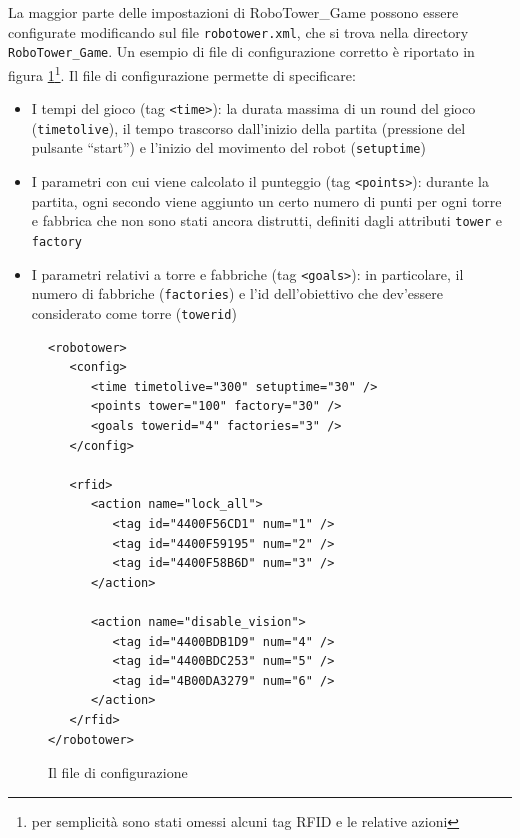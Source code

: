La maggior parte delle impostazioni di RoboTower\_Game possono essere configurate modificando sul file \verb|robotower.xml|, che si trova nella directory \verb|RoboTower_Game|. Un esempio di file di configurazione corretto è riportato in figura \ref{fig:configfile}\footnote{per semplicità sono stati omessi alcuni tag RFID e le relative azioni}. Il file di configurazione permette di specificare:
\begin{itemize}
\item I tempi del gioco (tag \lstinline|<time>|): la durata massima di un round del gioco (\lstinline|timetolive|), il tempo trascorso dall'inizio della partita (pressione del pulsante ``start'') e l'inizio del movimento del robot (\lstinline|setuptime|)
\item I parametri con cui viene calcolato il punteggio (tag \lstinline|<points>|): durante la partita, ogni secondo viene aggiunto un certo numero di punti per ogni torre e fabbrica che non sono stati ancora distrutti, definiti dagli attributi \lstinline|tower| e \lstinline|factory|
\item I parametri relativi a torre e fabbriche (tag \lstinline|<goals>|): in particolare, il numero di fabbriche (\lstinline|factories|) e l'id dell'obiettivo che dev'essere considerato come torre (\lstinline|towerid|)
\end{itemize}

\begin{figure}
{
\begin{lstlisting}
<robotower>
   <config>
      <time timetolive="300" setuptime="30" />
      <points tower="100" factory="30" />
      <goals towerid="4" factories="3" />
   </config>

   <rfid>
      <action name="lock_all">
         <tag id="4400F56CD1" num="1" />
         <tag id="4400F59195" num="2" />
         <tag id="4400F58B6D" num="3" />
      </action>
      
      <action name="disable_vision">
         <tag id="4400BDB1D9" num="4" />
         <tag id="4400BDC253" num="5" />
         <tag id="4B00DA3279" num="6" />
      </action>
   </rfid>
</robotower>
\end{lstlisting}
}
\caption{Il file di configurazione}
\label{fig:configfile}
\end{figure}

